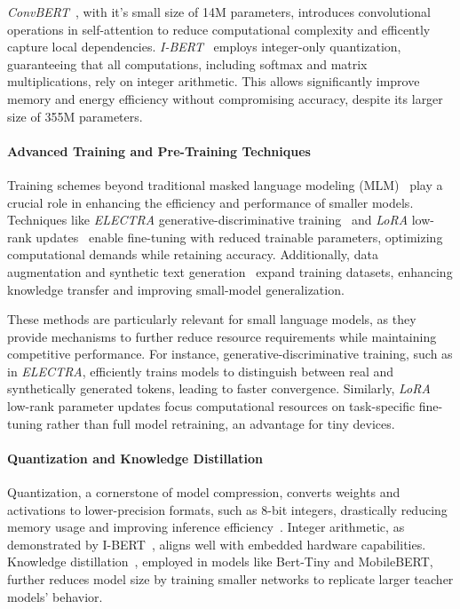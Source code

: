 \textit{ConvBERT}~\cite{ConvBERT}, with it's small size of 14M parameters, introduces convolutional operations in self-attention to reduce computational complexity and efficently capture local dependencies. \textit{I-BERT}~\cite{i-BERT} employs integer-only quantization, guaranteeing that all computations, including softmax and matrix multiplications, rely on integer arithmetic. This allows significantly improve memory and energy efficiency without compromising accuracy, despite its larger size of 355M parameters.

\paragraph{Advanced Training and Pre-Training Techniques}
Training schemes beyond traditional masked language modeling (MLM)~\cite{BERT} play a crucial role in enhancing the efficiency and performance of smaller models. Techniques like \textit{ELECTRA} generative-discriminative training~\cite{ELECTRA} and \textit{LoRA} low-rank updates~\cite{LoRA} enable fine-tuning with reduced trainable parameters, optimizing computational demands while retaining accuracy. Additionally, data augmentation and synthetic text generation~\cite{data_augmentation, synthetic_data} expand training datasets, enhancing knowledge transfer and improving small-model generalization.

These methods are particularly relevant for small language models, as they provide mechanisms to further reduce resource requirements while maintaining competitive performance. For instance, generative-discriminative training, such as in \textit{ELECTRA}, efficiently trains models to distinguish between real and synthetically generated tokens, leading to faster convergence. Similarly, \textit{LoRA} low-rank parameter updates focus computational resources on task-specific fine-tuning rather than full model retraining, an advantage for tiny devices.


\paragraph{Quantization and Knowledge Distillation}
Quantization, a cornerstone of model compression, converts weights and activations to lower-precision formats, such as 8-bit integers, drastically reducing memory usage and improving inference efficiency~\cite{quantization}. Integer arithmetic, as demonstrated by I-BERT~\cite{i-BERT}, aligns well with embedded hardware capabilities. Knowledge distillation~\cite{knowledge_distillation}, employed in models like Bert-Tiny and MobileBERT, further reduces model size by training smaller networks to replicate larger teacher models' behavior.

